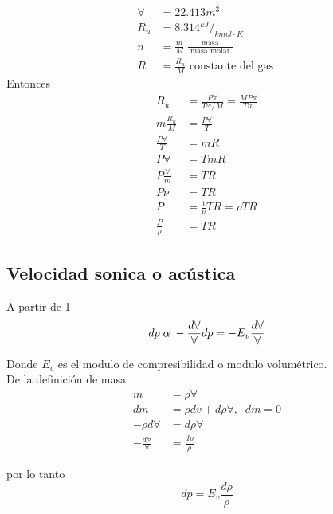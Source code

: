 \begin{enumerate}
\[\begin{split}
                \forall & = 22.413 m^{3} \\
                R_{u} & = 8.314 {}^{kJ}/_{kmol \cdot K} \\
                n & = \frac{ m }{ M } \; \frac{ \text{ masa } }{ \text{ masa molar } } \\
                R & = \frac{ R_{u} }{ M } \text{ constante del gas }
            \end{split}
        \]
        Entonces 
        \[
            \begin{split}
                R_{u} & = \frac{ P \forall }{ T {}^{m}/{M} } = \frac{ MP \forall }{ Tm } \\
                m \frac{ R_{u} }{ M } & = \frac{ P \forall }{ T } \\
                \frac{ P \forall }{ T } & = mR \\
                P \forall & = TmR \\
                P \frac{ \forall }{ m } & = TR \\
                P \nu & = TR \\
                P & = \frac{ 1 }{ \nu } TR = \rho TR \\
                \frac{ P }{ \rho } & = TR
            \end{split}
        \]
\end{enumerate}

\subsection{ Velocidad sonica o acústica }

A partir de 1
\[
    dp \; \alpha \; - \frac{ d \forall }{ \forall } \\
    dp = -E_{v} \frac{ d \forall }{ \forall }
\]

Donde \( E_{v} \) es el modulo de compresibilidad o modulo volumétrico. \\ 
De la definición de masa
\[
    \begin{split}
        m & = \rho \forall \\
        dm & = \rho dv + d\rho \forall, \;\; dm = 0 \\
        -\rho d\forall & = d\rho \forall \\
        - \frac{ d \forall }{ \forall } & = \frac{ d\rho }{ \rho }
    \end{split}
\]

por lo tanto
\[
    dp = E_{v} \frac{ d\rho }{ \rho }
\]

